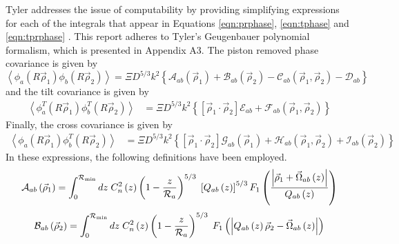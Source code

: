 Tyler addresses the issue of computability by providing simplifying
expressions for each of the integrals that appear in Equations
\ref{eqn:prphase}, \ref{eqn:tphase} and \ref{eqn:tprphase} .  This report
adheres to Tyler's Geugenbauer polynomial formalism, which is
presented in Appendix A3\cite{1994JOSAA..11..409T}.  The piston
removed phase covariance is given by
\begin{equation}\label{phasecovariance}
\left\langle \phi_{a}\left(R\vec{\rho}_{1}\right)  \phi_{b}\left(R\vec{\rho}_{2}\right)\right\rangle = 
\Xi D^{5/3} k^{2} \left\{
\mathcal{A}_{ab}\left(\vec{\rho}_{1}\right) + 
\mathcal{B}_{ab}\left(\vec{\rho}_{2}\right) - 
\mathcal{C}_{ab}\left(\vec{\rho}_{1},\vec{\rho}_{2}\right) - 
\mathcal{D}_{ab}\right\}
\end{equation}
and the tilt covariance is given by
\begin{equation}\label{tiltcovariance}
\begin{split}
\left\langle \phi^{T}_{a}\left(R\vec{\rho}_{1}\right)  \phi^{T}_{b}\left(R\vec{\rho}_{2}\right)\right\rangle & = 
\Xi D^{5/3} k^{2} \left\{
\left[\vec{\rho}_{1} \cdot \vec{\rho}_{2} \right] \mathcal{E}_{ab} + 
\mathcal{F}_{ab}\left(\vec{\rho}_{1}, \vec{\rho}_{2}\right)
\right\} 
\end{split}
\end{equation}
Finally, the cross covariance is given by
\begin{equation}\label{crosscovariance}
\begin{split}
\left\langle \phi_{a}\left(R\vec{\rho}_{1}\right)  \phi^{T}_{b}\left(R\vec{\rho}_{2}\right)\right\rangle & = 
\Xi D^{5/3} k^{2} \left\{
\left[\vec{\rho}_{1} \cdot \vec{\rho}_{2} \right] \mathcal{G}_{ab}\left(\vec{\rho}_{1}\right) + 
\mathcal{H}_{ab}\left(\vec{\rho}_{1}, \vec{\rho}_{2}\right) + 
\mathcal{I}_{ab}\left(\vec{\rho}_{2}\right)
\right\} 
\end{split}
\end{equation}
In these expressions, the following definitions have been employed.
\begin{equation}\label{caliph_A}
\mathcal{A}_{ab}\left(\vec{\rho}_{1}\right) = 
\int_{0}^{\mathcal{R}_{\rm min}} dz \; C_{n}^{2}\left(z\right) \left( 1 - \frac{z}{\mathcal{R}_{a}}\right)^{5/3}\; 
\left[Q_{ab}\left(z\right)\right]^{5/3} 
F_{1}\left(\frac{\left\vert\vec{\rho}_{1} + \vec{\Omega}_{ab}\left(z\right)\right\vert}{Q_{ab}\left(z\right)}\right)
\end{equation}
\begin{equation}\label{caliph_B}
\mathcal{B}_{ab}\left(\vec{\rho}_{2}\right) = 
\int_{0}^{\mathcal{R}_{\rm min}} dz \; C_{n}^{2}\left(z\right) \left( 1 - \frac{z}{\mathcal{R}_{a}}\right)^{5/3}\; 
F_{1}\left(\left\vert Q_{ab}\left(z\right)\vec{\rho}_{2} - \vec{\Omega}_{ab}\left(z\right)\right\vert\right)
\end{equation}
